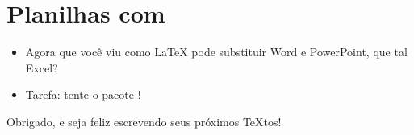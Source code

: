 \documentclass{beamer}
\begin{document}
\section{Planilhas com \protect{}}

\begin{frame}[fragile]{\insertsection}
\begin{itemize}
  \item Agora que você viu como \LaTeX{} pode substituir  Word e PowerPoint, que tal Excel?
  \item Tarefa: tente o pacote !
\end{itemize}
\end{frame}

\begin{frame}
\begin{center}
  Obrigado, e seja feliz escrevendo seus próximos \TeX{}tos!
\end{center}
\end{frame}
\end{document}
